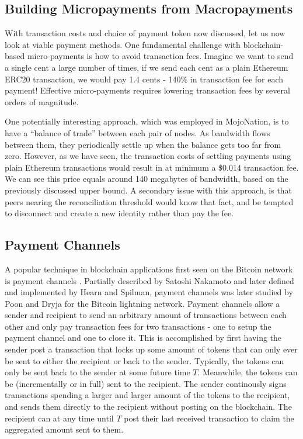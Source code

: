 \subsection{Building Micropayments from Macropayments}

With transaction costs and choice of payment token now discussed, let us now look at viable payment methods. One fundamental challenge with blockchain-based micro-payments is how to avoid transaction fees. Imagine we want to send a single cent a large number of times, if we send each cent as a plain Ethereum ERC20 transaction, we would pay 1.4 cents - 140\% in transaction fee for each payment! Effective micro-payments requires lowering transaction fees by several orders of magnitude.

One potentially interesting approach, which was employed in MojoNation\cite{mojonation}, is to have a ``balance of trade'' between each pair of nodes. As bandwidth flows between them, they periodically settle up when the balance gets too far from zero. However, as we have seen, the transaction costs of settling payments using plain Ethereum transactions would result in at minimum a \$0.014 transaction fee. We can see this price equals around 140 megabytes of bandwidth, based on the previously discussed upper bound. A secondary issue with this approach, is that peers nearing the reconciliation threshold would know that fact, and be tempted to disconnect and create a new identity rather than pay the fee.

\subsection{Payment Channels}

A popular technique in blockchain applications first seen on the Bitcoin network is payment channels \cite{PaymentChannels}. Partially described by Satoshi Nakamoto\cite{Satoshi} and later defined and implemented by Hearn and Spilman\cite{BitcoinWikiContracts}, payment channels was later studied by Poon and Dryja\cite{PoonDryja} for the Bitcoin lightning network. Payment channels allow a sender and recipient to send an arbitrary amount of transactions between each other and only pay transaction fees for two transactions - one to setup the payment channel and one to close it. This is accomplished by first having the sender post a transaction that locks up some amount of tokens that can only ever be sent to either the recipient or back to the sender. Typically, the tokens can only be sent back to the sender at some future time $T$. Meanwhile, the tokens can be (incrementally or in full) sent to the recipient. The sender continously signs transactions spending a larger and larger amount of the tokens to the recipient, and sends them directly to the recipient without posting on the blockchain. The recipient can at any time until $T$ post their last received transaction to claim the aggregated amount sent to them.

